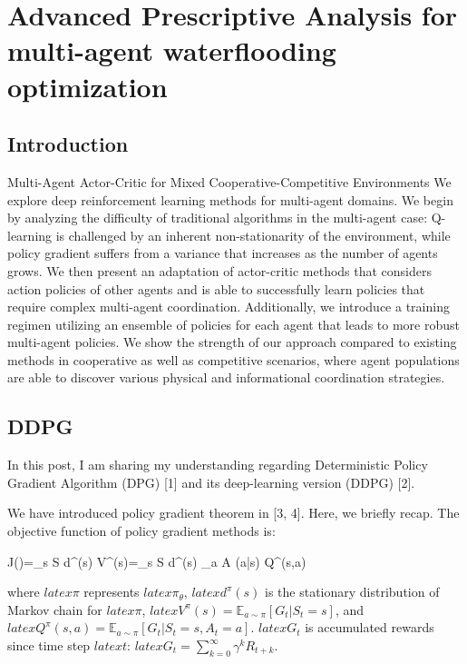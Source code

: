 \chapter{Advanced Prescriptive Analysis for multi-agent waterflooding optimization}

\section{Introduction}
Multi-Agent Actor-Critic for Mixed Cooperative-Competitive Environments
We explore deep reinforcement learning methods for multi-agent domains. We begin by analyzing the difficulty of traditional algorithms in the multi-agent case: Q-learning is challenged by an inherent non-stationarity of the environment, while policy gradient suffers from a variance that increases as the number of agents grows. We then present an adaptation of actor-critic methods that considers action policies of other agents and is able to successfully learn policies that require complex multi-agent coordination. Additionally, we introduce a training regimen utilizing an ensemble of policies for each agent that leads to more robust multi-agent policies. We show the strength of our approach compared to existing methods in cooperative as well as competitive scenarios, where agent populations are able to discover various physical and informational coordination strategies.

\section{DDPG}

In this post, I am sharing my understanding regarding Deterministic Policy Gradient Algorithm (DPG) [1] and its deep-learning version (DDPG) [2].

We have introduced policy gradient theorem in [3, 4]. Here, we briefly recap. The objective function of policy gradient methods is:

 J(\theta)=\sum\limits_{s \in S} d^\pi(s) V^\pi(s)=\sum\limits_{s \in S} d^\pi(s) \sum\limits_{a \in A} \pi(a|s) Q^\pi(s,a)

where $latex \pi$ represents $latex \pi_\theta$, $latex d^\pi(s)$ is the stationary distribution of Markov chain for $latex \pi$, $latex V^\pi(s)=\mathbb{E}_{a \sim \pi}[G_t|S_t=s]$, and $latex Q^{\pi}(s,a)=\mathbb{E}_{a \sim \pi}[G_t|S_t=s, A_t=a]$. $latex G_t$ is accumulated rewards since time step $latex t$: $latex G_t=\sum^\infty_{k=0}\gamma^k R_{t+k}$.

